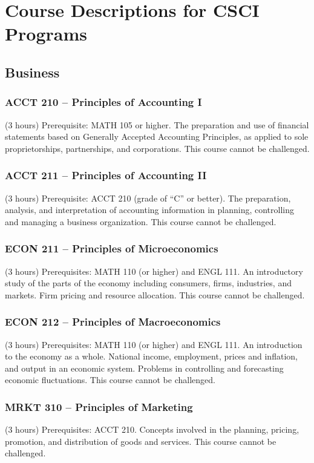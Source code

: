 \section{Course Descriptions for CSCI Programs}

\subsection{Business}
\subsubsection{ACCT 210 -- Principles of Accounting I}
(3 hours) Prerequisite: MATH 105 or higher. The preparation and use of financial statements based on Generally Accepted Accounting Principles, as applied to sole proprietorships, partnerships, and corporations. This course cannot be challenged.

\subsubsection{ACCT 211 -- Principles of Accounting II}
(3 hours) Prerequisite: ACCT 210 (grade of “C” or better). The preparation, analysis, and interpretation of accounting information in planning, controlling and managing a business organization. This course cannot be challenged.

\subsubsection{ECON 211 -- Principles of Microeconomics}
(3 hours) Prerequisites: MATH 110 (or higher) and ENGL 111. An introductory study of the parts of the economy including consumers, firms, industries, and markets. Firm pricing and resource allocation. This course cannot be challenged.

\subsubsection{ECON 212 -- Principles of Macroeconomics}
(3 hours) Prerequisites: MATH 110 (or higher) and ENGL 111. An introduction to the economy as a whole. National income, employment, prices and inflation, and output in an economic system. Problems in controlling and forecasting economic fluctuations. This course cannot be challenged.

\subsubsection{MRKT 310 -- Principles of Marketing}
(3 hours) Prerequisites: ACCT 210. Concepts involved in the planning, pricing, promotion, and distribution of goods and services. This course cannot be challenged.

